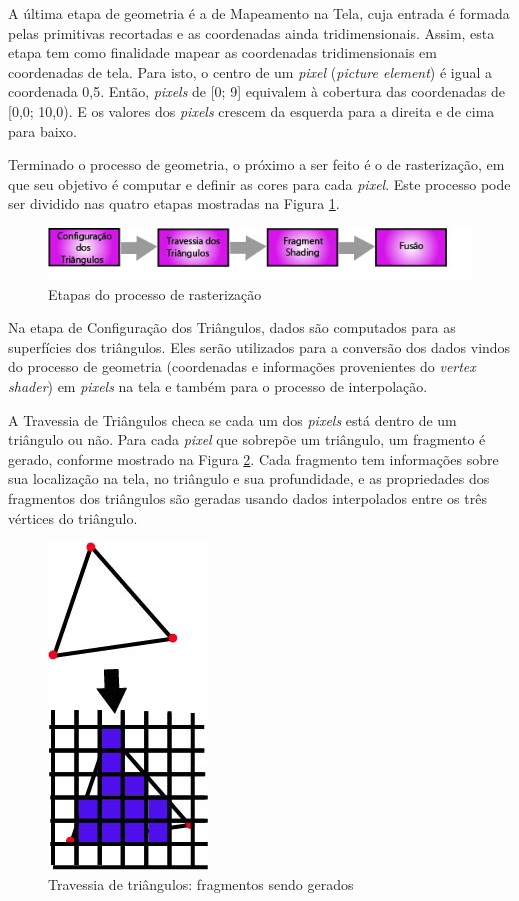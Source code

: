 	A última etapa de geometria é a de Mapeamento na Tela, cuja entrada é formada pelas primitivas recortadas e as coordenadas ainda tridimensionais. Assim, esta etapa tem como finalidade mapear as coordenadas tridimensionais em coordenadas de tela. Para isto, o centro de um \textit{pixel} (\textit{picture element}) é igual a coordenada 0,5. Então, \textit{pixels} de [0; 9] equivalem à cobertura das coordenadas de [0,0; 10,0). E os valores dos \textit{pixels} crescem da esquerda para a direita e de cima para baixo.

	Terminado o processo de geometria, o próximo a ser feito é o de rasterização, em que seu objetivo é computar e definir as cores para cada \textit{pixel}. Este processo pode ser dividido nas quatro etapas mostradas na Figura \ref{rasteriza}.

   \begin{figure}[h]
       \centering
	\includegraphics[keepaspectratio=true,scale=0.8]{figuras/rasteriza.jpg}
       \caption{Etapas do processo de rasterização}
       \label{rasteriza}
       \end{figure}

	Na etapa de Configuração dos Triângulos, dados são computados para as superfícies dos triângulos. Eles serão utilizados para a conversão dos dados vindos do processo de geometria (coordenadas e informações provenientes do \textit{vertex shader}) em \textit{pixels} na tela e também para o processo de interpolação. 

	A Travessia de Triângulos checa se cada um dos \textit{pixels} está dentro de um triângulo ou não. Para cada \textit{pixel} que sobrepõe um triângulo, um fragmento é gerado, conforme mostrado na Figura \ref{traversal}. Cada fragmento tem informações sobre sua localização na tela, no triângulo e sua profundidade, e as propriedades dos fragmentos dos triângulos são geradas usando dados interpolados entre os três vértices do triângulo. 

  \begin{figure}[h]
       \centering
	\includegraphics[keepaspectratio=true,scale=0.8]{figuras/traversal.jpg}
       \caption{Travessia de triângulos: fragmentos sendo gerados}
       \label{traversal}
       \end{figure}

